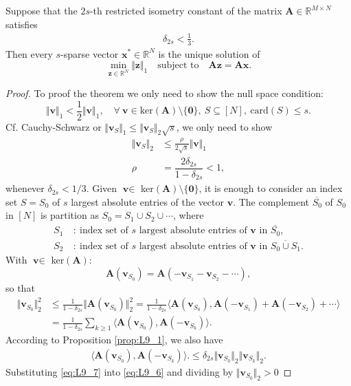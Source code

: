 \begin{theorem}
Suppose that the $2s$-th restricted isometry constant of the matrix $\textbf{A} \in \mathbb{R}^{M \times N}$ satisfies
\begin{align*}
    \delta_{2s} < \frac{1}{3}.
\end{align*}
Then every $s$-sparse vector $\textbf{x}^\ast \in \mathbb{R}^N$ is the unique solution of
$$
\min_{\textbf{z} \in \mathbb{R}^N} \Vert \textbf{z} \Vert_1 \quad \text{subject to} \quad \textbf{Az} = \textbf{Ax}.
$$
\end{theorem}
\begin{proof}
To proof the theorem we only need to show the null space condition:
$$
\Vert \textbf{v} \Vert_1 < \frac{1}{2} \Vert \textbf{v} \Vert_1, \quad \forall \ \textbf{v} \in \text{ker}(\textbf{A})\setminus \{\textbf{0}\}, \ S \subseteq [N], \ \text{card}(S) \leq s.
$$
Cf. Cauchy-Schwarz or $\Vert \textbf{v}_S \Vert_1 \leq \Vert \textbf{v}_S \Vert_2 \sqrt{s}$, we only need to show
\begin{align*}
\Vert \textbf{v}_S \Vert_2 &\leq \frac{\rho}{2 \sqrt{s}} \Vert \textbf{v} \Vert_1 \\
\rho &= \dfrac{2 \delta_{2s}}{1 - \delta_{2s}} < 1,
\end{align*}
whenever $\delta_{2s} < 1/3$. Given $\textbf{v} \in$ ker$(\textbf{A})\setminus \{\textbf{0}\}$, it is enough to consider an index set $S = S_0$ of $s$ largest absolute entries of the vector $\textbf{v}$. The complement $\overline{S_0}$ of $S_0$ in $[N]$ is partition as $S_0 = S_1 \cup S_2 \cup \cdots$, where
\begin{align*}
    S_1 \ &: \ \text{index set of } s \text{ largest absolute entries of } \textbf{v} \text{ in } \overline{S_0}, \\
    S_2 \ &: \ \text{index set of } s \text{ largest absolute entries of } \textbf{v} \text{ in } \overline{S_0 \cup S_1}.
\end{align*}
With $\textbf{v} \in$ ker$(\textbf{A})$:
$$
\textbf{A}(\textbf{v}_{S_0}) = \textbf{A}(-\textbf{v}_{S_1} - \textbf{v}_{S_2} - \cdots),
$$
so that
\begin{align}\label{eq:L9_6}
\Vert \textbf{v}_{S_0} \Vert_2^2 &\leq \frac{1}{1 - \delta_{2s}} \Vert \textbf{A}(\textbf{v}_{S_0}) \Vert_2^2 = \frac{1}{1 - \delta_{2s}} \langle \textbf{A}(\textbf{v}_{S_0}), \textbf{A}(-\textbf{v}_{S_1}) + \textbf{A}(-\textbf{v}_{S_2}) + \cdots \rangle \nonumber \\
    &= \frac{1}{1 - \delta_{2s}} \sum_{k \geq 1} \langle \textbf{A}(\textbf{v}_{S_0}), \textbf{A}(-\textbf{v}_{S_k}) \rangle.
\end{align}
According to Proposition \ref{prop:L9_1}, we also have
\begin{align}\label{eq:L9_7}
    \langle \textbf{A}(\textbf{v}_{S_0}), \textbf{A}(-\textbf{v}_{S_k}) \rangle. \leq \delta_{2s} \Vert \textbf{v}_{S_0} \Vert_2 \Vert \textbf{v}_{S_k} \Vert_2.
\end{align}
Substituting \eqref{eq:L9_7} into \eqref{eq:L9_6} and dividing by $\Vert \textbf{v}_{S_0} \Vert_2 > 0$
\end{proof}


